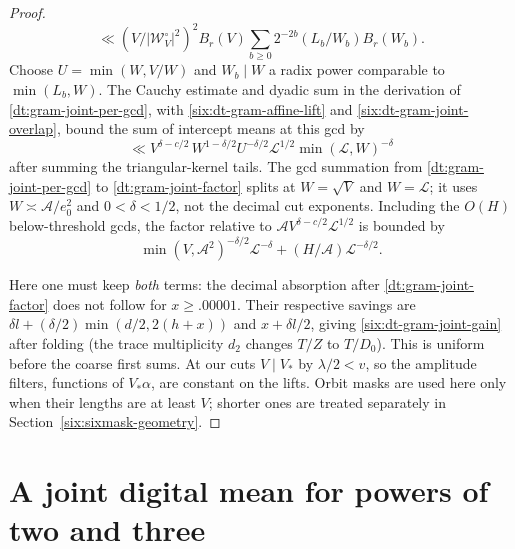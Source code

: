 \documentclass[11pt,a4paper]{article}
\theoremstyle{paperplain}
\numberwithin{equation}{section}
\begin{document}
\begin{proof}
\begin{equation}
 \ll (V/|\mathcal W_V^\circ|^2)^2 B_r(V)
        \sum_{b\ge0}2^{-2b}(L_b/W_b)B_r(W_b).
 \label{six:dt-gram-fejer}
\end{equation}
Choose $U=\min(W,V/W)$ and $W_b\mid W$ a radix power comparable to
$\min(L_b,W)$. The Cauchy estimate and dyadic sum in the derivation of
\eqref{dt:gram-joint-per-gcd}, with \eqref{six:dt-gram-affine-lift}
and \eqref{six:dt-gram-joint-overlap}, bound the sum of intercept means at this gcd by
\begin{equation}
 \ll V^{\delta-c/2}\,
           W^{1-\delta/2}U^{-\delta/2}
                 \mathcal L^{1/2}\min(\mathcal L,W)^{-\delta}
 \label{six:dt-gram-joint-per-gcd}
\end{equation}
after summing the triangular-kernel tails. The gcd summation from
\eqref{dt:gram-joint-per-gcd} to \eqref{dt:gram-joint-factor} splits at
$W=\sqrt V$ and $W=\mathcal L$; it uses $W\asymp\mathcal A/e_0^2$
and $0<\delta<1/2$, not the decimal cut exponents. Including the
$O(H)$ below-threshold gcds, the factor relative to
$\mathcal A V^{\delta-c/2}\mathcal L^{1/2}$ is bounded by
\begin{equation}
   \min(V,\mathcal A^2)^{-\delta/2}\mathcal L^{-\delta}
                       +(H/\mathcal A)\mathcal L^{-\delta/2}.
 \label{six:dt-gram-joint-factor}
\end{equation}

Here one must keep \emph{both} terms: the decimal absorption after
\eqref{dt:gram-joint-factor} does not follow for $x\ge .00001$.
Their respective savings are $\delta l+(\delta/2)\min(d/2,2(h+x))$
and $x+\delta l/2$, giving \eqref{six:dt-gram-joint-gain} after folding
(the trace multiplicity $d_2$ changes $T/Z$ to $T/D_0$). This is uniform
before the coarse first sums. At our cuts $V\mid V_*$ by $\lambda/2<v$,
so the amplitude filters, functions of $V_*\alpha$, are constant on the
lifts. Orbit masks are used here only when their lengths are at least
$V$; shorter ones are treated separately in Section~\ref{six:sixmask-geometry}.
\end{proof}

\section{A joint digital mean for powers of two and three}
\label{six:joint-digital}
\end{document}
